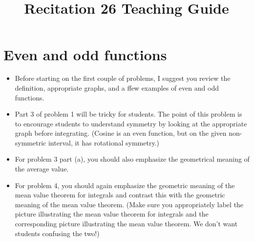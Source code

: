 \documentclass[nooutcomes]{ximera}
\title{Recitation 26 Teaching Guide}
\begin{document}
\begin{abstract}		\end{abstract}
\maketitle

\section{Even and odd functions}

\begin{itemize}
  \item 
    Before starting on the first couple of problems, I suggest you review the definition, appropriate graphs, and a ffew examples of even and odd functions.

  \item 
    Part 3 of problem 1 will be tricky for students.
    The point of this problem is to encourage students to understand symmetry by looking at the appropriate graph before integrating.
    (Cosine is an even function, but on the given non-symmetric interval, it has rotational symmetry.) 

  \item
    For problem 3 part (a), you should also emphasize the geometrical meaning of the average value. 

  \item 
    For problem 4, you should again emphasize the geometric meaning of the mean value theorem for integrals and contrast this with the geometric meaning of the mean value theorem.
    (Make sure you appropriately label the picture illustrating the mean value theorem for integrals and the corresponding picture illustrating the mean value theorem.
    We don't want students confusing the two!)
\end{itemize}

\end{document}
